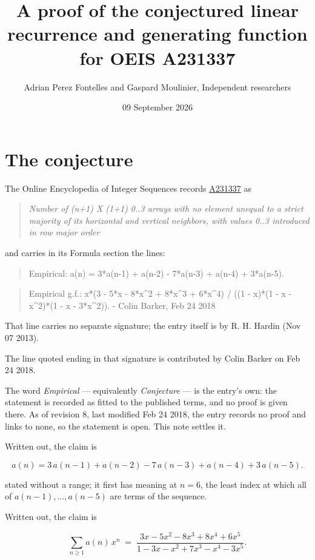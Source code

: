 \documentclass[11pt]{article}
\title{A proof of the conjectured linear recurrence and generating function for OEIS A231337}
\author{Adrian Perez Fontelles and Gaspard Moulinier, Independent researchers}
\date{09 September 2026}
\theoremstyle{definition}
\begin{document}
\maketitle
\section{The conjecture}

The Online Encyclopedia of Integer Sequences records \href{https://oeis.org/A231337}{A231337} as

\begin{quote}\itshape Number of (n+1) X (1+1) 0..3 arrays with no element unequal to a strict majority of its horizontal and vertical neighbors, with values 0..3 introduced in row major order\end{quote}

and carries in its Formula section the lines:

\begin{quote}\ttfamily Empirical: a(n) = 3*a(n-1) + a(n-2) - 7*a(n-3) + a(n-4) + 3*a(n-5).\end{quote}

\begin{quote}\ttfamily Empirical g.f.: x*(3 - 5*x - 8*x\textasciicircum{}2 + 8*x\textasciicircum{}3 + 6*x\textasciicircum{}4) / ((1 - x)*(1 - x - x\textasciicircum{}2)*(1 - x - 3*x\textasciicircum{}2)). - Colin Barker, Feb 24 2018\end{quote}

That line carries no separate signature; the entry itself is by R. H. Hardin (Nov 07 2013).

The line quoted ending in that signature is contributed by Colin Barker on Feb 24 2018.

The word {\itshape Empirical} --- equivalently {\itshape Conjecture} --- is the entry's own: the statement is recorded as fitted to the published terms, and no proof is given there. As of revision 8, last modified Feb 24 2018, the entry records no proof and links to none, so the statement is open. This note settles it.

Written out, the claim is

\[a(n) = 3\,a(n-1) + a(n-2) - 7\,a(n-3) + a(n-4) + 3\,a(n-5).\]

stated without a range; it first has meaning at $n = 6$, the least index at which all of $a(n-1),\dots,a(n-5)$ are terms of the sequence.

Written out, the claim is

\[\sum_{n \ge 1} a(n)\,x^n \;=\; \frac{3x - 5x^{2} - 8x^{3} + 8x^{4} + 6x^{5}}{1 - 3x - x^{2} + 7x^{3} - x^{4} - 3x^{5}}.\]
\end{document}
